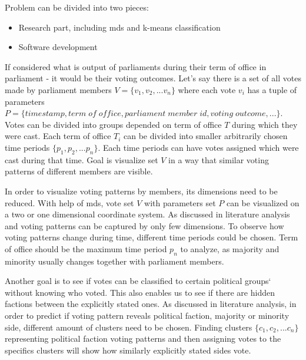 \documentclass[a4paper,12pt]{article}
\begin{document}
 	Problem can be divided into two pieces:
 	\begin{itemize}
 		\item Research part, including \gls{mds} and \gls{k-means} classification
 		\item Software development
 	\end{itemize}
 	
 	If considered what is output of parliaments during their term of office in parliament - it would be their voting outcomes. Let's say there is a set of all votes made by parliament members $V = \{v_1, v_2, ... v_n\}$ where each vote $v_i$ has a tuple of parameters $P = \{timestamp, term\; of\; office, parliament\;member\;id, voting\;outcome,...\}$. Votes can be divided into groups depended on term of office $T$ during which they were cast. Each term of office $T_i$ can be divided into smaller arbitrarily chosen time periods $\{p_1, p_2, ...p_n\}$. Each time periods can have votes assigned which were cast during that time. Goal is visualize set $V$ in a way that similar voting patterns of different members are visible. 
 	
 	In order to visualize voting patterns by members, its dimensions need to be reduced. With help of \acrfull{mds}, vote set $V$ with parameters set $P$ can be visualized on a two or one dimensional coordinate system. As discussed in literature analysis and \cite{poole_2005} voting patterns can be captured by only few dimensions. To observe how voting patterns change during time, different time periods could be chosen. Term of office should be the maximum time period $p_n$ to analyze, as majority and minority usually changes together with parliament members.
 	
 	Another goal is to see if votes can be classified to certain political groups` without knowing who voted. This also enables us to see if there are hidden factions between the explicitly stated ones. As discussed in literature analysis, in order to predict if voting pattern reveals political faction, majority or minority side, different amount of clusters need to be chosen. Finding clusters $\{c_1, c_2,...c_n\}$ representing political faction voting patterns and then assigning votes to the specifics clusters will show how similarly explicitly stated sides vote. 
 
 	
 	\clearpage
 	
\end{document}
